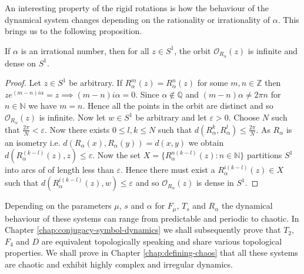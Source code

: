 An interesting property of the rigid rotations is how the behaviour of the dynamical system changes depending on the rationality or irrationality of $\alpha$. This brings us to the following proposition.

\begin{prop} \label{prop:rigid-rotations-irrational}
    If $\alpha$ is an irrational number, then for all $z \in S^1$, the orbit $\mathcal{O}_{R_\alpha}(z)$ is infinite and dense on $S^1$.
    \begin{proof}
        Let $z \in S^1$ be arbitrary. If $R_\alpha^m(z) = R_\alpha^n(z)$ for some $m, n \in \mathbb{Z}$ then $ze^{(m-n)i\alpha} = z \implies (m - n)i\alpha = 0$. Since $\alpha \notin \mathbb{Q}$ and $(m - n)\alpha \neq 2\pi n$ for $n \in \mathbb{N}$ we have $m = n$. Hence all the points in the orbit are distinct and so $\mathcal{O}_{R_\alpha}(z)$ is infinite. Now let $w \in S^1$ be arbitrary and let $\varepsilon > 0$. Choose $N$ such that $\frac{2\pi}{N} < \varepsilon$. Now there exists $0 \leq l, k \leq N$ such that $d\left( R_\alpha^k, R_\alpha^l \right) \leq \frac{2\pi}{N}$. As $R_\alpha$ is an isometry i.e. $d(R_\alpha(x), R_\alpha(y)) = d(x, y)$ we obtain $d(R_\alpha^{(k - l)}(z), z) \leq \varepsilon$. Now the set $X = \lbrace R_\alpha^{n(k - l)}(z) : n \in \mathbb{N} \rbrace$ partitions $S^1$ into arcs of of length less than $\varepsilon$. Hence there must exist a $R_\alpha^{i(k - l)}(z) \in X$ such that $d(R_\alpha^{i(k - l)}(z), w) \leq \varepsilon$ and so $\mathcal{O}_{R_{\alpha}}(z)$ is dense in $S^1$.
    \end{proof}
\end{prop}

Depending on the parameters $\mu$, $s$ and $\alpha$ for $F_\mu$, $T_s$ and $R_\alpha$ the dynamical behaviour of these systems can range from predictable and periodic to chaotic. In Chapter \ref{chap:conjugacy-symbol-dynamics} we shall subsequently prove that $T_2$, $F_4$ and $D$ are equivalent topologically speaking and share various topological properties. We shall prove in Chapter \ref{chap:defining-chaos} that all these systems are chaotic and exhibit highly complex and irregular dynamics.